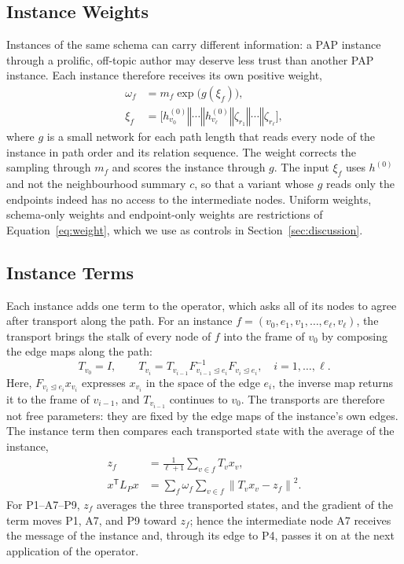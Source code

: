\documentclass{article}
\newcommand{\norm}[1]{\left\lVert #1\right\rVert}
\newcommand{\transpose}{\mathsf{T}}
\newcommand{\concat}{\mathbin\Vert}
\newcommand{\inc}{\trianglelefteq}
\begin{document}
\subsection{Instance Weights}
Instances of the same schema can carry different information: a PAP instance through a prolific, off-topic author may deserve less trust than another PAP instance. Each instance therefore receives its own positive weight,
\begin{equation}
\begin{aligned}
  \omega_f&=m_f\exp\!\bigl(g(\xi_f)\bigr),\\
  \xi_f&=\bigl[h_{v_0}^{(0)}\concat\cdots\concat h_{v_\ell}^{(0)}\concat\zeta_{r_1}\concat\cdots\concat\zeta_{r_\ell}\bigr],
\end{aligned}
  \label{eq:weight}
\end{equation}
where $g$ is a small network for each path length that reads every node of the instance in path order and its relation sequence. The weight corrects the sampling through $m_f$ and scores the instance through $g$. The input $\xi_f$ uses $h^{(0)}$ and not the neighbourhood summary $c$, so that a variant whose $g$ reads only the endpoints indeed has no access to the intermediate nodes. Uniform weights, schema-only weights and endpoint-only weights are restrictions of Equation~\eqref{eq:weight}, which we use as controls in Section~\ref{sec:discussion}.

\subsection{Instance Terms}
\label{sec:instance-term}
Each instance adds one term to the operator, which asks all of its nodes to agree after transport along the path. For an instance $f=(v_0,e_1,v_1,\ldots,e_\ell,v_\ell)$, the transport brings the stalk of every node of $f$ into the frame of $v_0$ by composing the edge maps along the path:
\begin{equation}
  T_{v_0}=I,\qquad
  T_{v_i}=T_{v_{i-1}}F_{v_{i-1}\inc e_i}^{-1}F_{v_i\inc e_i},\quad i=1,\ldots,\ell .
  \label{eq:transport}
\end{equation}
Here, $F_{v_i\inc e_i}x_{v_i}$ expresses $x_{v_i}$ in the space of the edge $e_i$, the inverse map returns it to the frame of $v_{i-1}$, and $T_{v_{i-1}}$ continues to $v_0$. The transports are therefore not free parameters: they are fixed by the edge maps of the instance's own edges. The instance term then compares each transported state with the average of the instance,
\begin{equation}
\begin{aligned}
  z_f&=\frac{1}{\ell+1}\sum_{v\in f}T_vx_v,\\
  x^{\transpose}L_Px&=\sum_f\omega_f\sum_{v\in f}\norm{T_vx_v-z_f}^2 .
\end{aligned}
  \label{eq:instance-term}
\end{equation}
For P1--A7--P9, $z_f$ averages the three transported states, and the gradient of the term moves P1, A7, and P9 toward $z_f$; hence the intermediate node A7 receives the message of the instance and, through its edge to P4, passes it on at the next application of the operator.
\end{document}

